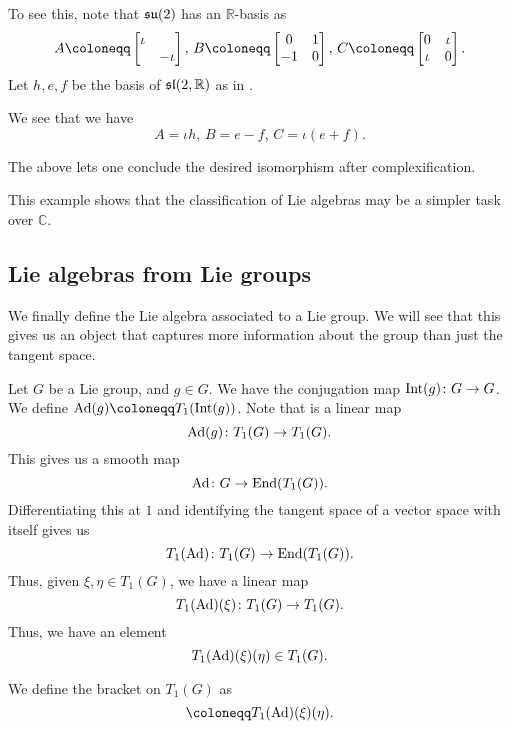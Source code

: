 \documentclass[12pt]{article}
\begin{document}
To see this, note that $\su(2)$ has an $\mathbb{R}$-basis as
\begin{equation*} 
	A \coloneqq \two{\iota}{}{}{-\iota},\, B \coloneqq \two{0}{1}{-1}{0},\, C \coloneqq \two{0}{\iota}{\iota}{0}.
\end{equation*}
Let $h, e, f$ be the basis of $\sl(2, \mathbb{R})$ as in . 

We see that we have
\begin{equation*} 
	A = \iota h,\, B = e - f,\, C = \iota(e + f).
\end{equation*}

The above lets one conclude the desired isomorphism after complexification.

This example shows that the classification of Lie algebras may be a simpler task over $\mathbb{C}$.

\subsection{Lie algebras from Lie groups}

We finally define the Lie algebra associated to a Lie group. 
We will see that this gives us an object that captures more information about the group than just the tangent space.

Let $G$ be a Lie group, and $g \in G$. 
We have the conjugation map $\INT(g) \colon G \to G$. 
We define $\Ad(g) \coloneqq T_{1}(\INT(g))$. 
Note that is a linear map
\begin{equation*} 
	\Ad(g) \colon T_{1}(G) \to T_{1}(G).
\end{equation*}
This gives us a smooth map
\begin{equation*} 
	\Ad \colon G \to \End(T_{1}(G)).
\end{equation*}
Differentiating this at $1$ and identifying the tangent space of a vector space with itself gives us
\begin{equation} \label{eq:t1-ad-t1-G-end-t1-G}
	T_{1}(\Ad) \colon T_{1}(G) \to \End(T_{1}(G)).
\end{equation}
Thus, given $\xi, \eta \in T_{1}(G)$, we have a linear map
\begin{equation*} 
	T_{1}(\Ad)(\xi) \colon T_{1}(G) \to T_{1}(G).
\end{equation*}
Thus, we have an element
\begin{equation*} 
	T_{1}(\Ad)(\xi)(\eta) \in T_{1}(G).
\end{equation*}

We define the bracket on $T_{1}(G)$ as
\begin{equation*} 
	[\xi, \eta] \coloneqq T_{1}(\Ad)(\xi)(\eta).
\end{equation*}
\end{document}
